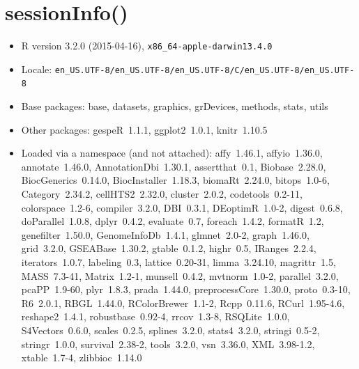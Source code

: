 \documentclass{article}\usepackage[]{graphicx}\usepackage[]{color}
\begin{document}
\section{sessionInfo()}
\begin{itemize}\raggedright
  \item R version 3.2.0 (2015-04-16), \verb|x86_64-apple-darwin13.4.0|
  \item Locale: \verb|en_US.UTF-8/en_US.UTF-8/en_US.UTF-8/C/en_US.UTF-8/en_US.UTF-8|
  \item Base packages: base, datasets, graphics, grDevices,
    methods, stats, utils
  \item Other packages: gespeR~1.1.1, ggplot2~1.0.1, knitr~1.10.5
  \item Loaded via a namespace (and not attached): affy~1.46.1,
    affyio~1.36.0, annotate~1.46.0, AnnotationDbi~1.30.1,
    assertthat~0.1, Biobase~2.28.0, BiocGenerics~0.14.0,
    BiocInstaller~1.18.3, biomaRt~2.24.0, bitops~1.0-6,
    Category~2.34.2, cellHTS2~2.32.0, cluster~2.0.2,
    codetools~0.2-11, colorspace~1.2-6, compiler~3.2.0, DBI~0.3.1,
    DEoptimR~1.0-2, digest~0.6.8, doParallel~1.0.8, dplyr~0.4.2,
    evaluate~0.7, foreach~1.4.2, formatR~1.2, genefilter~1.50.0,
    GenomeInfoDb~1.4.1, glmnet~2.0-2, graph~1.46.0, grid~3.2.0,
    GSEABase~1.30.2, gtable~0.1.2, highr~0.5, IRanges~2.2.4,
    iterators~1.0.7, labeling~0.3, lattice~0.20-31, limma~3.24.10,
    magrittr~1.5, MASS~7.3-41, Matrix~1.2-1, munsell~0.4.2,
    mvtnorm~1.0-2, parallel~3.2.0, pcaPP~1.9-60, plyr~1.8.3,
    prada~1.44.0, preprocessCore~1.30.0, proto~0.3-10, R6~2.0.1,
    RBGL~1.44.0, RColorBrewer~1.1-2, Rcpp~0.11.6, RCurl~1.95-4.6,
    reshape2~1.4.1, robustbase~0.92-4, rrcov~1.3-8, RSQLite~1.0.0,
    S4Vectors~0.6.0, scales~0.2.5, splines~3.2.0, stats4~3.2.0,
    stringi~0.5-2, stringr~1.0.0, survival~2.38-2, tools~3.2.0,
    vsn~3.36.0, XML~3.98-1.2, xtable~1.7-4, zlibbioc~1.14.0
\end{itemize}
\end{document}
